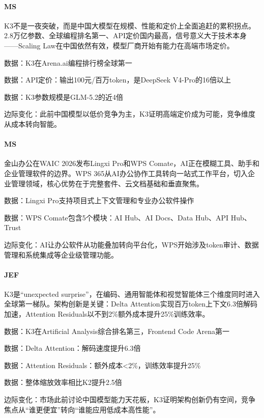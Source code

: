 \documentclass[11pt]{ctexart}
\begin{document}
\paragraph{MS} K3不是一夜突破，而是中国大模型在规模、性能和定价上全面追赶的累积拐点。2.8万亿参数、全球编程排名第一、API定价国内最高，信号意义大于技术本身——Scaling Law在中国依然有效，模型厂商开始有能力在高端市场定价。
{\small\color{refgray}数据：K3在Arena.ai编程排行榜全球第一\par}
{\small\color{refgray}数据：API定价：输出100元/百万token，是DeepSeek V4-Pro的16倍以上\par}
{\small\color{refgray}数据：K3参数规模是GLM-5.2的近4倍\par}
{\small\color{refgray}边际变化：此前中国模型以低价竞争为主，K3证明高端定价成为可能，竞争维度从成本转向智能。\par}
\paragraph{MS} 金山办公在WAIC 2026发布Lingxi Pro和WPS Comate，AI正在模糊工具、助手和企业管理软件的边界。WPS 365从AI办公协作工具转向一站式工作平台，切入企业管理领域，核心优势在于完整套件、云文档基础和垂直聚焦。
{\small\color{refgray}数据：Lingxi Pro支持项目式上下文管理和专业办公软件操作\par}
{\small\color{refgray}数据：WPS Comate包含5个模块：AI Hub、AI Docs、Data Hub、API Hub、Trust\par}
{\small\color{refgray}边际变化：AI让办公软件从功能叠加转向平台化，WPS开始涉及token审计、数据管理和系统集成等企业级管理功能。\par}
\paragraph{JEF} K3是“unexpected surprise”，在编码、通用智能体和视觉智能体三个维度同时进入全球第一梯队。架构创新是关键：Delta Attention实现百万token上下文6.3倍解码加速，Attention Residuals以不到2\%额外成本提升25\%训练效率。
{\small\color{refgray}数据：K3在Artificial Analysis综合排名第三，Frontend Code Arena第一\par}
{\small\color{refgray}数据：Delta Attention：解码速度提升6.3倍\par}
{\small\color{refgray}数据：Attention Residuals：额外成本<2\%，训练效率提升25\%\par}
{\small\color{refgray}数据：整体缩放效率相比K2提升2.5倍\par}
{\small\color{refgray}边际变化：市场此前讨论中国模型能力天花板，K3证明架构创新仍有空间，竞争焦点从“谁更便宜”转向“谁能应用低成本高性能”。\par}
\end{document}
